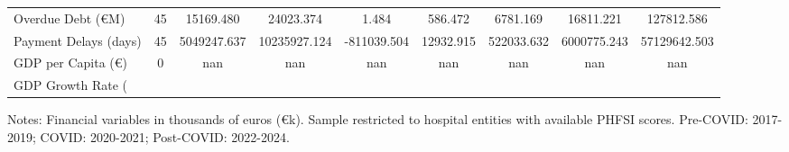 \begin{table}[htbp]
\begin{tabular}{lcccccccc}
Overdue Debt (€M) & 45 & 15169.480 & 24023.374 & 1.484 & 586.472 & 6781.169 & 16811.221 & 127812.586 \\
Payment Delays (days) & 45 & 5049247.637 & 10235927.124 & -811039.504 & 12932.915 & 522033.632 & 6000775.243 & 57129642.503 \\
GDP per Capita (€) & 0 & nan & nan & nan & nan & nan & nan & nan \\
GDP Growth Rate (%
\\
\hline\hline
\end{tabular}
\begin{tablenotes}
\small
\item Notes: Financial variables in thousands of euros (€k). 
Sample restricted to hospital entities with available PHFSI scores. 
Pre-COVID: 2017-2019; COVID: 2020-2021; Post-COVID: 2022-2024.
\end{tablenotes}
\end{table}